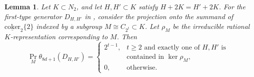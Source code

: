 \documentclass{amsart}
\theoremstyle{plain}
\newtheorem{lemma}[theorem]{Lemma}
\theoremstyle{definition}
\theoremstyle{remark}
\begin{document}
\begin{lemma}\label{lem:theta-8d-plus-1-type-one}
    Let $K\subset N_2$, and let $H,H'\subset K$ satisfy $H+2K=H'+2K$. For the first-type generator $D_{H,H'}$ in , consider the projection onto the summand of $\underline{\mathrm{coker}}_2\{2\}$ indexed by a subgroup $M\cong C_{2^t}\subset K$. Let $\rho_M$ be the irreducible rational $K$-representation corresponding to $M$. Then
    \[
    \operatorname{Pr}_M\theta_{8d+1}(D_{H,H'}) = \begin{cases} 
        2^{t-1}, & t\geq 2 \text{ and exactly one of } H, H' \text{ is }\\
        & \text{contained in } \ker \rho_M,\\ 
        0, & \text{otherwise.}
    \end{cases}
    \]
\end{lemma}
\end{document}

